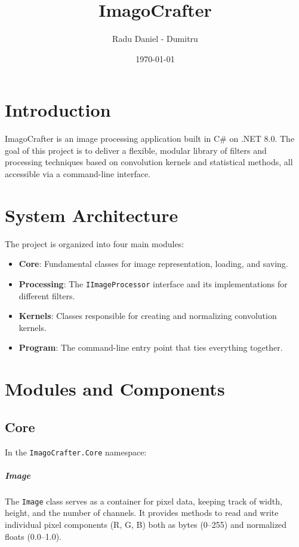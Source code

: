 \documentclass[12pt,a4paper]{report}
\title{ImagoCrafter}
\author{Radu Daniel - Dumitru}
\date{\today}
\begin{document}
\maketitle
\tableofcontents

\chapter{Introduction}
ImagoCrafter is an image processing application built in C\# on .NET 8.0. The goal of this project is to deliver a flexible, modular library of filters and processing techniques based on convolution kernels and statistical methods, all accessible via a command-line interface.

\chapter{System Architecture}
The project is organized into four main modules:
\begin{itemize}
  \item \textbf{Core}: Fundamental classes for image representation, loading, and saving.
  \item \textbf{Processing}: The \texttt{IImageProcessor} interface and its implementations for different filters.
  \item \textbf{Kernels}: Classes responsible for creating and normalizing convolution kernels.
  \item \textbf{Program}: The command-line entry point that ties everything together.
\end{itemize}

\chapter{Modules and Components}

\section{Core}
In the \texttt{ImagoCrafter.Core} namespace:

\paragraph{Image}
The \texttt{Image} class serves as a container for pixel data, keeping track of width, height, and the number of channels. It provides methods to read and write individual pixel components (R, G, B) both as bytes (0–255) and normalized floats (0.0–1.0).
\end{document}

